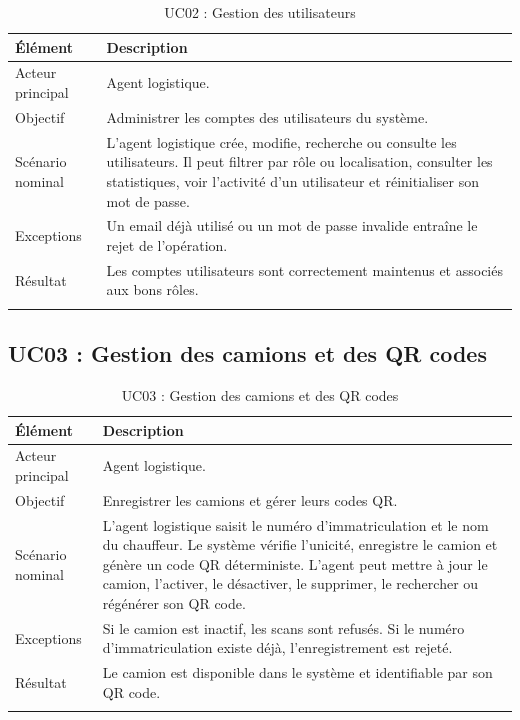\begin{longtable}{|p{4cm}|p{10cm}|}
\hline
\textbf{Élément} & \textbf{Description} \\
\hline
\endhead

Acteur principal & Agent logistique. \\
\hline
Objectif & Administrer les comptes des utilisateurs du système. \\
\hline
Scénario nominal & L'agent logistique crée, modifie, recherche ou consulte les utilisateurs. Il peut filtrer par rôle ou localisation, consulter les statistiques, voir l'activité d'un utilisateur et réinitialiser son mot de passe. \\
\hline
Exceptions & Un email déjà utilisé ou un mot de passe invalide entraîne le rejet de l'opération. \\
\hline
Résultat & Les comptes utilisateurs sont correctement maintenus et associés aux bons rôles. \\
\hline
\caption{UC02 : Gestion des utilisateurs}
\label{tab:uc-gestion-utilisateurs}
\end{longtable}

\subsection{UC03 : Gestion des camions et des QR codes}

\begin{longtable}{|p{4cm}|p{10cm}|}
\hline
\textbf{Élément} & \textbf{Description} \\
\hline
\endhead

Acteur principal & Agent logistique. \\
\hline
Objectif & Enregistrer les camions et gérer leurs codes QR. \\
\hline
Scénario nominal & L'agent logistique saisit le numéro d'immatriculation et le nom du chauffeur. Le système vérifie l'unicité, enregistre le camion et génère un code QR déterministe. L'agent peut mettre à jour le camion, l'activer, le désactiver, le supprimer, le rechercher ou régénérer son QR code. \\
\hline
Exceptions & Si le camion est inactif, les scans sont refusés. Si le numéro d'immatriculation existe déjà, l'enregistrement est rejeté. \\
\hline
Résultat & Le camion est disponible dans le système et identifiable par son QR code. \\
\hline
\caption{UC03 : Gestion des camions et des QR codes}
\label{tab:uc-gestion-camions}
\end{longtable}

